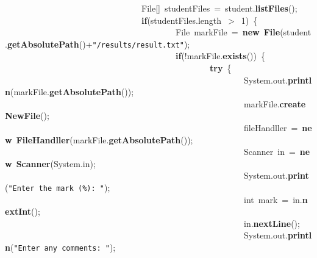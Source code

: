 \mbox{}\ \ \ \ \ \ \ \ \ \ \ \ \ \ \ \ \ \ \ \ \ \ \ \ \ \ \ \ \ \ \ \ File[]\ studentFiles\ =\ student.\textbf{listFiles}(); \\
\mbox{}\ \ \ \ \ \ \ \ \ \ \ \ \ \ \ \ \ \ \ \ \ \ \ \ \ \ \ \ \ \ \ \ \textbf{if}(studentFiles.length\ $>$\ 1)\ \{ \\
\mbox{}\ \ \ \ \ \ \ \ \ \ \ \ \ \ \ \ \ \ \ \ \ \ \ \ \ \ \ \ \ \ \ \ \ \ \ \ \ \ \ \ File\ markFile\ =\ \textbf{new}\ \textbf{File}(student.\textbf{getAbsolutePath}()+\texttt{"{}/results/result.txt"{}}); \\
\mbox{}\ \ \ \ \ \ \ \ \ \ \ \ \ \ \ \ \ \ \ \ \ \ \ \ \ \ \ \ \ \ \ \ \ \ \ \ \ \ \ \ \textbf{if}(!markFile.\textbf{exists}())\ \{ \\
\mbox{}\ \ \ \ \ \ \ \ \ \ \ \ \ \ \ \ \ \ \ \ \ \ \ \ \ \ \ \ \ \ \ \ \ \ \ \ \ \ \ \ \ \ \ \ \ \ \ \ \textbf{try}\ \{ \\
\mbox{}\ \ \ \ \ \ \ \ \ \ \ \ \ \ \ \ \ \ \ \ \ \ \ \ \ \ \ \ \ \ \ \ \ \ \ \ \ \ \ \ \ \ \ \ \ \ \ \ \ \ \ \ \ \ \ \ System.out.\textbf{println}(markFile.\textbf{getAbsolutePath}()); \\
\mbox{}\ \ \ \ \ \ \ \ \ \ \ \ \ \ \ \ \ \ \ \ \ \ \ \ \ \ \ \ \ \ \ \ \ \ \ \ \ \ \ \ \ \ \ \ \ \ \ \ \ \ \ \ \ \ \ \ markFile.\textbf{createNewFile}(); \\
\mbox{}\ \ \ \ \ \ \ \ \ \ \ \ \ \ \ \ \ \ \ \ \ \ \ \ \ \ \ \ \ \ \ \ \ \ \ \ \ \ \ \ \ \ \ \ \ \ \ \ \ \ \ \ \ \ \ \ fileHandller\ =\ \textbf{new}\ \textbf{FileHandller}(markFile.\textbf{getAbsolutePath}()); \\
\mbox{}\ \ \ \ \ \ \ \ \ \ \ \ \ \ \ \ \ \ \ \ \ \ \ \ \ \ \ \ \ \ \ \ \ \ \ \ \ \ \ \ \ \ \ \ \ \ \ \ \ \ \ \ \ \ \ \ Scanner\ in\ =\ \textbf{new}\ \textbf{Scanner}(System.in); \\
\mbox{}\ \ \ \ \ \ \ \ \ \ \ \ \ \ \ \ \ \ \ \ \ \ \ \ \ \ \ \ \ \ \ \ \ \ \ \ \ \ \ \ \ \ \ \ \ \ \ \ \ \ \ \ \ \ \ \ System.out.\textbf{print}(\texttt{"{}Enter\ the\ mark\ (\%):\ "{}}); \\
\mbox{}\ \ \ \ \ \ \ \ \ \ \ \ \ \ \ \ \ \ \ \ \ \ \ \ \ \ \ \ \ \ \ \ \ \ \ \ \ \ \ \ \ \ \ \ \ \ \ \ \ \ \ \ \ \ \ \ int\ mark\ =\ in.\textbf{nextInt}(); \\
\mbox{}\ \ \ \ \ \ \ \ \ \ \ \ \ \ \ \ \ \ \ \ \ \ \ \ \ \ \ \ \ \ \ \ \ \ \ \ \ \ \ \ \ \ \ \ \ \ \ \ \ \ \ \ \ \ \ \ in.\textbf{nextLine}(); \\
\mbox{}\ \ \ \ \ \ \ \ \ \ \ \ \ \ \ \ \ \ \ \ \ \ \ \ \ \ \ \ \ \ \ \ \ \ \ \ \ \ \ \ \ \ \ \ \ \ \ \ \ \ \ \ \ \ \ \ System.out.\textbf{println}(\texttt{"{}Enter\ any\ comments:\ "{}}); \\
